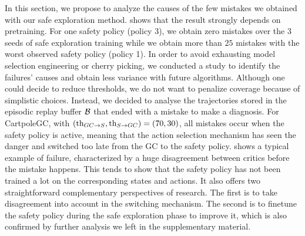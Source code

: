 In this section, we propose to analyze the causes of the few mistakes we obtained with our
safe exploration method.
 shows that the result strongly depends on pretraining. For one 
safety policy (policy 3), we obtain zero mistakes over the $3$ seeds of safe exploration training
while we obtain more than $25$ mistakes with the worst observed safety policy (policy 1). 
In order to avoid exhausting model selection engineering or cherry picking, we conducted a 
study to identify the failures' causes and obtain less variance with future algorithms.
Although one could decide to reduce thresholds, we do not want to penalize 
coverage because of simplistic choices.
Instead, we decided to analyse the trajectories stored in the episodic replay buffer $\mathcal{B}$ that ended
with a mistake to make a diagnosis. 
For CartpoleGC, with $(\text{th}_{GC \rightarrow S}, \text{th}_{S \rightarrow GC}) = (70,30)$, 
all mistakes occur when the safety policy is active, meaning that the action selection mechanism
has seen the danger and switched too late from the GC to the safety policy. 
 shows a typical example of failure, 
characterized by a huge disagreement between critics before the mistake happens. This tends to
show that the safety policy has not been trained a lot on the corresponding states and actions. 
It also offers two straightforward complementary perspectives of research. The first is to take disagreement into 
account in the switching mechanism. The second is to finetune the safety policy during the safe exploration phase
to improve it, which is also confirmed by further analysis we left in the supplementary material.




